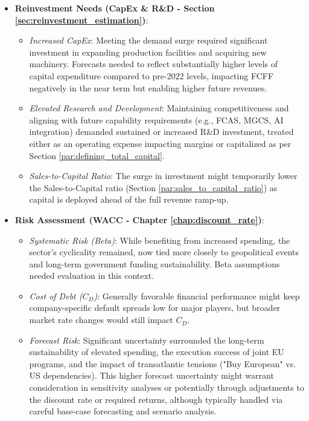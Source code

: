 \begin{itemize}
    \item \textbf{Reinvestment Needs (CapEx \& R\&D - Section \ref{sec:reinvestment_estimation})}:
          \begin{itemize}
              \item \textit{Increased CapEx}: Meeting the demand surge required significant investment in expanding production facilities and acquiring new machinery. Forecasts needed to reflect substantially higher levels of capital expenditure compared to pre-2022 levels, impacting FCFF negatively in the near term but enabling higher future revenues.
              \item \textit{Elevated Research and Development}: Maintaining competitiveness and aligning with future capability requirements (e.g., FCAS, MGCS, AI integration) demanded sustained or increased R\&D investment, treated either as an operating expense impacting margins or capitalized as per Section \ref{par:defining_total_capital}.
              \item \textit{Sales-to-Capital Ratio}: The surge in investment might temporarily lower the Sales-to-Capital ratio (Section \ref{par:sales_to_capital_ratio}) as capital is deployed ahead of the full revenue ramp-up.
          \end{itemize}

    \item \textbf{Risk Assessment (WACC - Chapter \ref{chap:discount_rate})}:
          \begin{itemize}
              \item \textit{Systematic Risk (Beta)}: While benefiting from increased spending, the sector's cyclicality remained, now tied more closely to geopolitical events and long-term government funding sustainability. Beta assumptions needed evaluation in this context.
              \item \textit{Cost of Debt (\(C_D\))}: Generally favorable financial performance might keep company-specific default spreads low for major players, but broader market rate changes would still impact \(C_D\).
              \item \textit{Forecast Risk}: Significant uncertainty surrounded the long-term sustainability of elevated spending, the execution success of joint EU programs, and the impact of transatlantic tensions ("Buy European" vs. US dependencies). This higher forecast uncertainty might warrant consideration in sensitivity analyses or potentially through adjustments to the discount rate or required returns, although typically handled via careful base-case forecasting and scenario analysis.
          \end{itemize}
\end{itemize}

